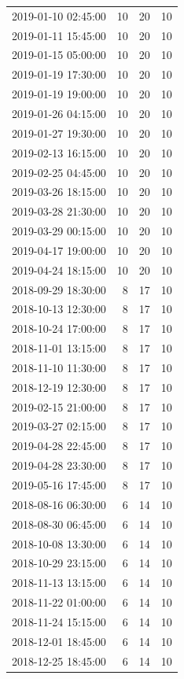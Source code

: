 \begin{tabular}{lrrr}
2019-01-10 02:45:00 & 10 & 20 & 10 \\
2019-01-11 15:45:00 & 10 & 20 & 10 \\
2019-01-15 05:00:00 & 10 & 20 & 10 \\
2019-01-19 17:30:00 & 10 & 20 & 10 \\
2019-01-19 19:00:00 & 10 & 20 & 10 \\
2019-01-26 04:15:00 & 10 & 20 & 10 \\
2019-01-27 19:30:00 & 10 & 20 & 10 \\
2019-02-13 16:15:00 & 10 & 20 & 10 \\
2019-02-25 04:45:00 & 10 & 20 & 10 \\
2019-03-26 18:15:00 & 10 & 20 & 10 \\
2019-03-28 21:30:00 & 10 & 20 & 10 \\
2019-03-29 00:15:00 & 10 & 20 & 10 \\
2019-04-17 19:00:00 & 10 & 20 & 10 \\
2019-04-24 18:15:00 & 10 & 20 & 10 \\
2018-09-29 18:30:00 & 8 & 17 & 10 \\
2018-10-13 12:30:00 & 8 & 17 & 10 \\
2018-10-24 17:00:00 & 8 & 17 & 10 \\
2018-11-01 13:15:00 & 8 & 17 & 10 \\
2018-11-10 11:30:00 & 8 & 17 & 10 \\
2018-12-19 12:30:00 & 8 & 17 & 10 \\
2019-02-15 21:00:00 & 8 & 17 & 10 \\
2019-03-27 02:15:00 & 8 & 17 & 10 \\
2019-04-28 22:45:00 & 8 & 17 & 10 \\
2019-04-28 23:30:00 & 8 & 17 & 10 \\
2019-05-16 17:45:00 & 8 & 17 & 10 \\
2018-08-16 06:30:00 & 6 & 14 & 10 \\
2018-08-30 06:45:00 & 6 & 14 & 10 \\
2018-10-08 13:30:00 & 6 & 14 & 10 \\
2018-10-29 23:15:00 & 6 & 14 & 10 \\
2018-11-13 13:15:00 & 6 & 14 & 10 \\
2018-11-22 01:00:00 & 6 & 14 & 10 \\
2018-11-24 15:15:00 & 6 & 14 & 10 \\
2018-12-01 18:45:00 & 6 & 14 & 10 \\
2018-12-25 18:45:00 & 6 & 14 & 10 \\

\end{tabular}

